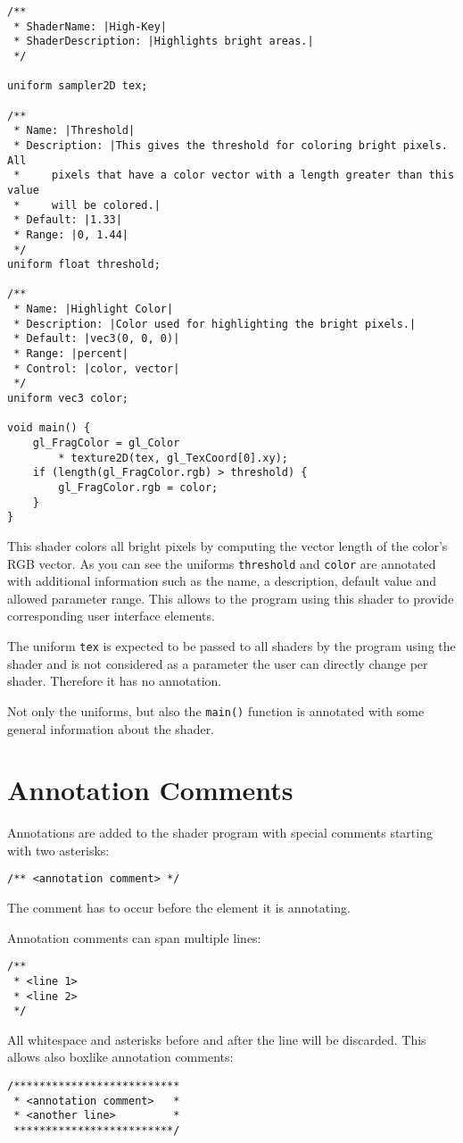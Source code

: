 \documentclass[11pt,a4paper]{scrreprt}
\begin{document}
\begin{lstlisting}
/**
 * ShaderName: |High-Key|
 * ShaderDescription: |Highlights bright areas.|
 */

uniform sampler2D tex;

/**
 * Name: |Threshold|
 * Description: |This gives the threshold for coloring bright pixels. All
 *     pixels that have a color vector with a length greater than this value
 *     will be colored.|
 * Default: |1.33|
 * Range: |0, 1.44|
 */
uniform float threshold;

/**
 * Name: |Highlight Color|
 * Description: |Color used for highlighting the bright pixels.|
 * Default: |vec3(0, 0, 0)|
 * Range: |percent|
 * Control: |color, vector|
 */
uniform vec3 color;

void main() {
    gl_FragColor = gl_Color
        * texture2D(tex, gl_TexCoord[0].xy);
    if (length(gl_FragColor.rgb) > threshold) {
        gl_FragColor.rgb = color;
    }
}
\end{lstlisting}
This shader colors all bright pixels by computing the vector length of the 
color's RGB vector. As you can see the uniforms \lstinline$threshold$ and 
\lstinline$color$ are annotated with additional information such as the name, 
a description, default value and allowed parameter range. This allows to the 
program using this shader to provide corresponding user interface elements.

The uniform \lstinline$tex$ is expected to be passed to all shaders by the 
program using the shader and is not considered as a parameter the user can 
directly change per shader. Therefore it has no annotation.

Not only the uniforms, but also the \lstinline$main()$ function is annotated 
with some general information about the shader.

\chapter{Annotation Comments}
Annotations are added to the shader program with special comments starting with 
two asterisks:
\begin{lstlisting}
/** <annotation comment> */
\end{lstlisting}
The comment has to occur before the element it is annotating.

Annotation comments can span multiple lines:
\begin{lstlisting}
/**
 * <line 1>
 * <line 2>
 */
\end{lstlisting}
All whitespace and asterisks before and after the line will be discarded. This 
allows also boxlike annotation comments:
\begin{lstlisting}
/**************************
 * <annotation comment>   *
 * <another line>         *
 *************************/
\end{lstlisting}
\end{document}
